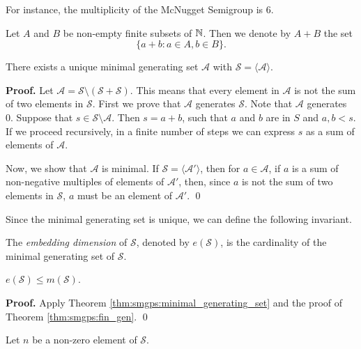 For instance, the multiplicity of the McNugget Semigroup is 6. \par

Let $A$ and $B$ be non-empty finite subsets of $\mathbb{N}$. Then we denote by $A + B$ the set \[\{a + b : a \in A, b \in B\}.\] 

\begin{theorem}\label{thm:smgps:minimal_generating_set}
     There exists a unique minimal generating set $\mathcal{A}$ with $\mathcal{S} = \langle \mathcal{A} \rangle$.
\end{theorem}

\textbf{Proof. } Let $\mathcal{A} = \mathcal{S} \setminus(\mathcal{S} + \mathcal{S})$. This means that every element in $\mathcal{A}$ is not the sum of two elements in $\mathcal{S}$. First we prove that $\mathcal{A}$ generates $\mathcal{S}$. Note that $\mathcal{A}$ generates 0. Suppose that $s\in \mathcal{S} \setminus \mathcal{A}$. Then $s = a + b$, such that $a$ and $b$ are in $S$ and $a, b < s$. If we proceed recursively, in a finite number of steps we can express $s$ as a sum of elements of $\mathcal{A}$. \par

Now, we show that $\mathcal{A}$ is minimal. If $\mathcal{S} = \langle \mathcal{A}' \rangle$, then for $a \in \mathcal{A}$, if $a$ is a sum of non-negative multiples of elements of $\mathcal{A}'$, then, since $a$ is not the sum of two elements in $\mathcal{S}$, $a$ must be an element of $\mathcal{A}'$. \qed \par

Since the minimal generating set is unique, we can define the following invariant.\par

\begin{definition}\label{def:smgps:embedding_dim}
    The \textit{embedding dimension} of $\mathcal{S}$, denoted by $e(\mathcal{S})$, is the cardinality of the minimal generating set of $\mathcal{S}$.
\end{definition}

\begin{corollary}\label{cor:smgps:embedding_dim}
    $e(\mathcal{S}) \leq m(\mathcal{S})$.
\end{corollary}
\textbf{Proof. } Apply Theorem \ref{thm:smgps:minimal_generating_set} and the proof of Theorem \ref{thm:smgps:fin_gen}. \qed \par

Let $n$ be a non-zero element of $\mathcal{S}$. \par

